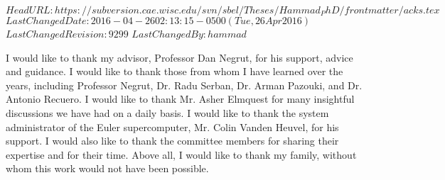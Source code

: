 \svnidlong
{$HeadURL: https://subversion.cae.wisc.edu/svn/sbel/Theses/Hammad_PhD/frontmatter/acks.tex $}
{$LastChangedDate: 2016-04-26 02:13:15 -0500 (Tue, 26 Apr 2016) $}
{$LastChangedRevision: 9299 $}
{$LastChangedBy: hammad $}

I would like to thank my advisor, Professor Dan Negrut, for his support, advice and guidance.  I would like to thank those from whom I have learned over the years, including Professor Negrut, Dr. Radu Serban, Dr. Arman Pazouki, and  Dr. Antonio Recuero. I would like to thank Mr. Asher Elmquest for many insightful discussions we have had on a daily basis. I would like to thank the system administrator of the Euler supercomputer, Mr. Colin Vanden Heuvel, for his support. I would also like to thank the committee members for sharing their expertise and for their time.
Above all, I would like to thank my family, without whom this work would not have been possible.

